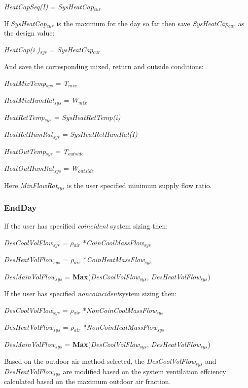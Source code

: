 \emph{HeatCapSeq(I)} = \emph{SysHeatCap\(_{cur}\)}

If \emph{SysHeatCap\(_{cur}\)} is the maximum for the day so far then save \emph{SysHeatCap\(_{cur}\)} as the design value:

\emph{HeatCap(i )\(_{sys}\)} = \emph{SysHeatCap\(_{cur}\)}

And save the corresponding mixed, return and outside conditions:

\emph{HeatMixTemp\(_{sys}\)} = \emph{T\(_{mix}\)}

\emph{HeatMixHumRat\(_{sys}\)} = \emph{W\(_{mix}\)}

\emph{HeatRetTemp\(_{sys}\)} = \emph{SysHeatRetTemp(i)}

\emph{HeatRetHumRat\(_{sys}\)} = \emph{SysHeatRetHumRat(I)}

\emph{HeatOutTemp\(_{sys}\)} = \emph{T\(_{outside}\)}

\emph{HeatOutHumRat\(_{sys}\)} = \emph{W\(_{outside}\)}

Here \emph{MinFlowRat\(_{sys}\)} is the user specified minimum supply flow ratio.

\subsubsection{EndDay}\label{endday}

If the user has specified \emph{coincident} system sizing then:

\emph{DesCoolVolFlow\(_{sys}\)} = \emph{$\rho$\(_{air}\)} *\emph{CoinCoolMassFlow\(_{sys}\)}

\emph{DesHeatVolFlow\(_{sys}\)} = \emph{$\rho$\(_{air}\)} *\emph{CoinHeatMassFlow\(_{sys}\)}

\emph{DesMainVolFlow\(_{sys}\)} = \textbf{Max}(\emph{DesCoolVolFlow\(_{sys}\)}, \emph{DesHeatVolFlow\(_{sys}\)})

If the user has specified \emph{noncoincident}system sizing then:

\emph{DesCoolVolFlow\(_{sys}\)} = \emph{$\rho$\(_{air}\)} *\emph{NonCoinCoolMassFlow\(_{sys}\)}

\emph{DesHeatVolFlow\(_{sys}\)} = \emph{$\rho$\(_{air}\)} *\emph{NonCoinHeatMassFlow\(_{sys}\)}

\emph{DesMainVolFlow\(_{sys}\)} = \textbf{Max}(\emph{DesCoolVolFlow\(_{sys}\)}, \emph{DesHeatVolFlow\(_{sys}\)})

Based on the outdoor air method selected, the \emph{DesCoolVolFlow\(_{sys}\)} and \emph{DesHeatVolFlow\(_{sys}\)} are modified based on the system ventilation effciency calculated based on the maximum outdoor air fraction.

